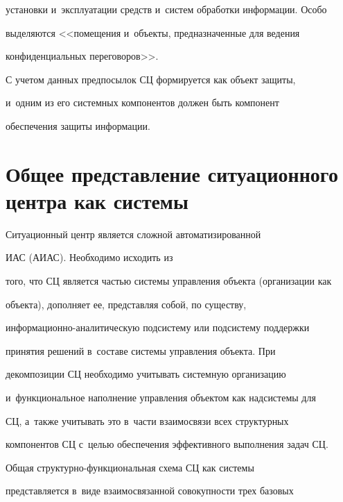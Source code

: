 установки и~эксплуатации средств и~сис\-тем обработки информации. Особо 

выделяются <<помещения и~объекты, предназначенные для ведения 

конфиденциальных переговоров>>.

    

    С учетом данных предпосылок СЦ формируется как объект защиты, 

и~одним из его сис\-тем\-ных компонентов должен быть компонент 

обеспечения защиты информации.

     

    \vspace*{-4pt}

    

        \section{Общее представление ситуационного центра как системы}



            \vspace*{-2pt}

    

    Ситуационный центр является сложной автоматизированной 

ИАС (АИАС). Необходимо исходить из 

того, что СЦ является частью сис\-те\-мы управ\-ле\-ния объекта (организации как 

объекта), дополняет ее, представляя собой, по существу,  

ин\-фор\-ма\-ци\-он\-но-ана\-ли\-ти\-че\-скую под\-сис\-те\-му или под\-сис\-те\-му поддержки 

принятия решений в~составе сис\-те\-мы управления объекта. При 

декомпозиции СЦ необходимо учитывать сис\-тем\-ную организацию 

и~функциональное наполнение управления объектом как над\-сис\-те\-мы для 

СЦ, а~также учитывать это в~части взаимосвязи всех структурных 

компонентов СЦ с~целью обеспечения эффективного выполнения задач СЦ.

    

    Общая структурно-функциональная схема СЦ как сис\-те\-мы 

представляется в~виде взаимосвязанной совокупности трех базовых 

